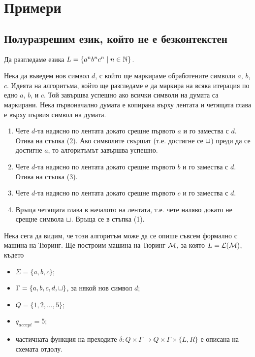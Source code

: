 


\section{Примери}

\subsection*{Полуразрешим език, който не е безконтекстен}

\begin{example}
  Да разгледаме езика $L = \{a^nb^nc^n \mid n\in\mathbb{N}\}$.
 
  Нека да въведем нов символ $d$, с който ще маркираме обработените символи $a$, $b$, $c$.
  Идеята на алгоритъма, който ще разгледаме е да маркира на всяка итерация по едно $a$, $b$, и $c$.
  Той завършва успешно ако всички символи на думата са маркирани.
  Нека първоначално думата е копирана върху лентата и четящата глава е върху първия символ на думата.
  \begin{enumerate}[(1)]
  \item 
    Чете $d$-та надясно по лентата докато срещне първото $a$ и го замества с $d$. Отива на стъпка (2).
    Ако символите свършат (т.е. достигне се $\sqcup$) преди да се достигне $a$,
    то алгоритъмът завършва успешно.
  \item
    Чете $d$-та надясно по лентата докато срещне първото $b$ и го замества с $d$.
    Отива на стъпка (3).
  \item
    Чете $d$-та надясно по лентата докато срещне първото $c$ и го замества с $d$.
  \item
    Връща четящата глава в началото на лентата, т.е. чете наляво докато не срещне символа $\sqcup$.
    Връща се в стъпка (1). 
  \end{enumerate}

  Нека сега да видим, че този алгоритъм може да се опише съвсем формално с машина на Тюринг.
  Ще построим машина на Тюринг $\mathcal{M}$, за която $L = \mathcal{L}(\mathcal{M})$, където
  \begin{itemize}
  \item 
    $\Sigma = \{a,b,c\}$;
  \item
    $\Gamma = \{a,b,c,d,\sqcup\}$, за някой нов символ $d$;
  \item
    $Q = \{1,2,\dots,5\}$;
  \item
    $q_{accept} = 5$;
  \item
    частичната функция на преходите $\delta:Q\times\Gamma \to Q\times\Gamma\times\{L,R\}$
    е описана на схемата отдолу.
  \end{itemize}


\end{example}
